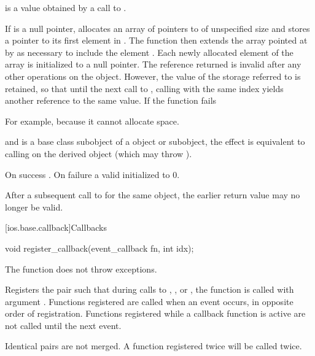 \begin{itemdescr}
\pnum
\expects
{} is a value obtained by a call to .

\pnum
\effects
If  is a null pointer, allocates an array of
pointers to  of unspecified size and stores a pointer to
its
first element in .
The function then extends the array
pointed at by  as necessary to include the element
.
Each newly allocated element of the array is initialized to a null
pointer.
The reference returned is invalid after any other operations on the
object.
However, the value of the storage referred to is retained, so
that until the next call to
,
calling
with the same index yields another reference to the same value.
If the function fails
\begin{footnote}
For example, because it cannot allocate space.
\end{footnote}
and
is a base class subobject of a
object or subobject, the effect is equivalent to calling
on the derived object (which may throw
).

\pnum
\returns
On success
.
On failure a valid
initialized to 0.

\pnum
\remarks
After a subsequent call to
for the same object, the earlier return value may no longer be valid.
\end{itemdescr}

[ios.base.callback]{Callbacks}

%
\begin{itemdecl}
void register_callback(event_callback fn, int idx);
\end{itemdecl}

\begin{itemdescr}
\pnum
\expects
The function
does not throw exceptions.

\pnum
\effects
Registers the pair
such that during calls to
,
,
or
,
the function
is called with argument
.
Functions registered are called when an event occurs, in opposite order of
registration.
Functions registered while a callback function is active are not called until the next event.

\pnum
\remarks
Identical pairs are not merged.
A function registered twice will be called twice.
\end{itemdescr}

